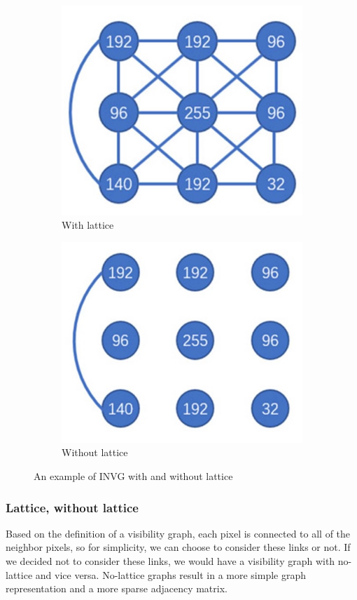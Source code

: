 \documentclass[conference]{IEEEtran}
\begin{document}
\begin{figure}[tbh]
    \centering
    \begin{subfigure}{0.24\textwidth}
        \centering
        \includegraphics[width=0.55\linewidth]{Lattice_IVG.jpg}
        \caption{With lattice}
        \label{fig:lattice_example}
    \end{subfigure}
    \hfill
    \begin{subfigure}{0.24\textwidth}
        \centering
        \includegraphics[width=0.55\linewidth]{Nolattice_IVG.jpg}
        \caption{Without lattice}
        \label{fig:nolattice_example}
    \end{subfigure}
    \caption{An example of INVG with and without lattice\cite{china_HVG}}
    \label{fig:lattice_nolattice_example}
\end{figure}


\subsubsection{\textbf{Lattice, without lattice}}
Based on the definition of a visibility graph, each pixel is connected to all of the neighbor pixels, so for simplicity, we can choose to consider these links or not. If we decided not to consider these links, we would have a visibility graph with no-lattice and vice versa. No-lattice graphs result in a more simple graph representation and a more sparse adjacency matrix.
\end{document}
